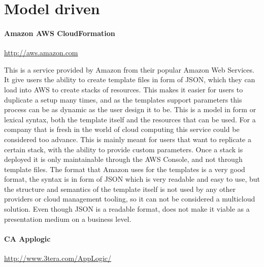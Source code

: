 


\section{Model driven}

\paragraph{Amazon AWS CloudFormation}
\url{http://aws.amazon.com}

This is a service provided by Amazon from their popular Amazon Web Services. 
It give users the ability to create template files in form of JSON, which they can load into AWS to create stacks of resources. 
This makes it easier for users to duplicate a setup many times, and as the templates support parameters this process 
can be as dynamic as the user design it to be. This is a model in form or lexical syntax, both the template itself and the resources that can be used.
For a company that is fresh in the world of cloud computing this service could be considered too advance. 
This is mainly meant for users that want to replicate a certain stack, with the ability to provide custom parameters. 
Once a stack is deployed it is only maintainable through the AWS Console, and not through template files. 
The format that Amazon uses for the templates is a very good format, the syntax is in form of JSON which is very readable and easy to use, 
but the structure and semantics of the template itself is not used by any other providers or cloud management tooling, 
so it can not be considered a multicloud solution. Even though JSON is a readable format, does not make it viable as a presentation medium on a business level.

\paragraph{CA Applogic}
\url{http://www.3tera.com/AppLogic/}

